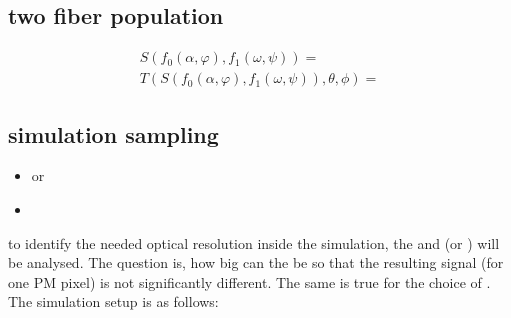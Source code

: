 \subsection{two fiber population}
\begin{align*}
    S(f_0(\alpha, \varphi), f_1(\omega, \psi)) = \\
    T(S(f_0(\alpha, \varphi), f_1(\omega, \psi)), \theta, \phi) = 
\end{align*}
% 
% 
\subsection{simulation sampling}
% 
\begin{itemize}
    \item \micro or \macro
    \item \voxelsize
\end{itemize}

to identify the needed optical resolution inside the simulation, the \voxelsize and \model(\micro or \macro) will be analysed.
The question is, how big can the \voxelsize be so that the resulting signal (for one \ac{PM} pixel) is not significantly different.
The same is true for the choice of \model.
The simulation setup is as follows:

